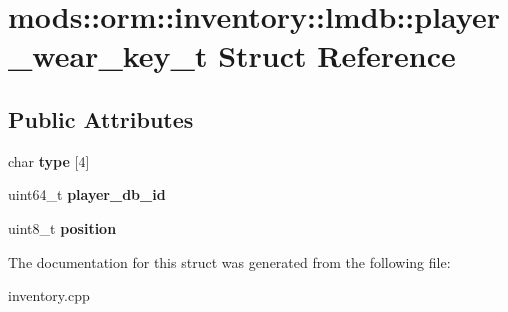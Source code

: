 \hypertarget{structmods_1_1orm_1_1inventory_1_1lmdb_1_1player__wear__key__t}{}\section{mods\+:\+:orm\+:\+:inventory\+:\+:lmdb\+:\+:player\+\_\+wear\+\_\+key\+\_\+t Struct Reference}
\label{structmods_1_1orm_1_1inventory_1_1lmdb_1_1player__wear__key__t}
\subsection*{Public Attributes}
\begin{DoxyCompactItemize}
\item 
\mbox{\label{structmods_1_1orm_1_1inventory_1_1lmdb_1_1player__wear__key__t_aa309c2b70f34c9b0b7289cb900ab20d9}} 
char {\bfseries type} \mbox{[}4\mbox{]}
\item 
\mbox{\label{structmods_1_1orm_1_1inventory_1_1lmdb_1_1player__wear__key__t_abf3914058c1b19b6acd27ef318df8b8e}} 
uint64\+\_\+t {\bfseries player\+\_\+db\+\_\+id}
\item 
\mbox{\label{structmods_1_1orm_1_1inventory_1_1lmdb_1_1player__wear__key__t_ac5ddfc43799d1af588babcbe87819d5f}} 
uint8\+\_\+t {\bfseries position}
\end{DoxyCompactItemize}


The documentation for this struct was generated from the following file\+:\begin{DoxyCompactItemize}
\item 
inventory.\+cpp\end{DoxyCompactItemize}
